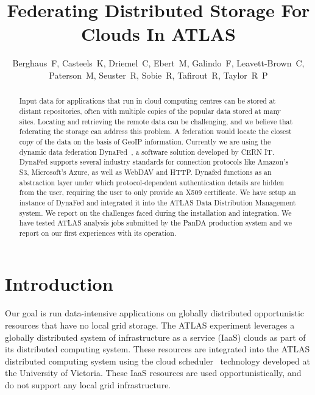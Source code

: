 \documentclass[a4paper]{jpconf}
\begin{document}
\title{Federating Distributed Storage For Clouds In ATLAS}

\author{Berghaus~F, Casteels~K, Driemel~C, Ebert~M, Galindo~F, Leavett-Brown~C, Paterson~M, Seuster~R, Sobie~R, Tafirout~R, Taylor~R~P}

\address{Frank~Berghaus, G07810, CERN, CH-1211 Geneva 23,  Switzerland}


\begin{abstract}
Input data for applications that run in cloud computing centres can be stored at distant repositories, often with multiple copies of the popular data stored at many sites. Locating and retrieving the remote data can be challenging, and we believe that federating the storage can address this problem. A federation would locate the closest copy of the data on the basis of GeoIP information. Currently we are using the dynamic data federation DynaFed~\cite{dynafed}, a software solution developed by CERN IT. DynaFed supports several industry standards for connection protocols like Amazon's S3, Microsoft's Azure, as well as WebDAV and HTTP. Dynafed functions as an abstraction layer under which protocol-dependent authentication details are  hidden from the user, requiring the user to only provide an X509 certificate. We have setup an instance of DynaFed and integrated it into the ATLAS Data Distribution Management system. We report on the challenges faced during the installation and integration. We have tested ATLAS analysis jobs submitted by the PanDA production system and we report on our first experiences with its operation.
\end{abstract}

\section{Introduction}
Our goal is run data-intensive applications on globally distributed opportunistic resources that have no local grid storage. The ATLAS experiment leverages a globally distributed system of infrastructure as a service (IaaS) clouds as part of its distributed computing system. These resources are integrated into the ATLAS distributed computing system using the cloud scheduler~\cite{cloud-scheduler} technology developed at the University of Victoria. These IaaS resources are used opportunistically, and do not support any local grid infrastructure.
\end{document}
